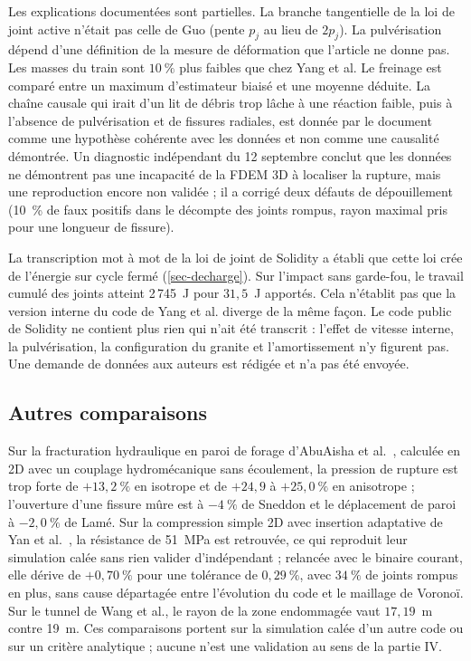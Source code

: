 Les explications documentées sont partielles. La branche tangentielle de la loi de joint active n'était pas celle de Guo (pente $p_j$ au lieu de $2p_j$). La pulvérisation dépend d'une définition de la mesure de déformation que l'article ne donne pas. Les masses du train sont $10~\%$ plus faibles que chez Yang et al. Le freinage est comparé entre un maximum d'estimateur biaisé et une moyenne déduite. La chaîne causale qui irait d'un lit de débris trop lâche à une réaction faible, puis à l'absence de pulvérisation et de fissures radiales, est donnée par le document comme une hypothèse cohérente avec les données et non comme une causalité démontrée. Un diagnostic indépendant du 12 septembre conclut que les données ne démontrent pas une incapacité de la FDEM 3D à localiser la rupture, mais une reproduction encore non validée ; il a corrigé deux défauts de dépouillement (10~\% de faux positifs dans le décompte des joints rompus, rayon maximal pris pour une longueur de fissure).

La transcription mot à mot de la loi de joint de Solidity a établi que cette loi crée de l'énergie sur cycle fermé (\cref{sec-decharge}). Sur l'impact sans garde-fou, le travail cumulé des joints atteint 2\,745~J pour $31{,}5$~J apportés. Cela n'établit pas que la version interne du code de Yang et al. diverge de la même façon. Le code public de Solidity ne contient plus rien qui n'ait été transcrit : l'effet de vitesse interne, la pulvérisation, la configuration du granite et l'amortissement n'y figurent pas. Une demande de données aux auteurs est rédigée et n'a pas été envoyée.

\subsection{Autres comparaisons}

Sur la fracturation hydraulique en paroi de forage d'AbuAisha et al.~\cite{abuaisha2017hm}, calculée en 2D avec un couplage hydromécanique sans écoulement, la pression de rupture est trop forte de $+13{,}2~\%$ en isotrope et de $+24{,}9$ à $+25{,}0~\%$ en anisotrope ; l'ouverture d'une fissure mûre est à $-4~\%$ de Sneddon et le déplacement de paroi à $-2{,}0~\%$ de Lamé. Sur la compression simple 2D avec insertion adaptative de Yan et al.~\cite{yan2023adaptive}, la résistance de 51~MPa est retrouvée, ce qui reproduit leur simulation calée sans rien valider d'indépendant ; relancée avec le binaire courant, elle dérive de $+0{,}70~\%$ pour une tolérance de $0{,}29~\%$, avec $34~\%$ de joints rompus en plus, sans cause départagée entre l'évolution du code et le maillage de Voronoï. Sur le tunnel de Wang et al., le rayon de la zone endommagée vaut $17{,}19$~m contre 19~m. Ces comparaisons portent sur la simulation calée d'un autre code ou sur un critère analytique ; aucune n'est une validation au sens de la partie IV.

